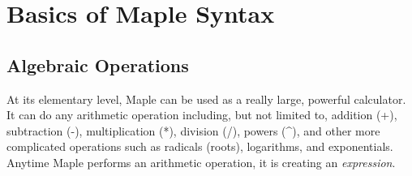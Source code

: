 \chapter{Basics of Maple Syntax}
\label{chp:basics_of_maple_syntax}

\section{Algebraic Operations}
\label{sec:algebraic_operations}

At its elementary level, Maple can be used as a really large, powerful calculator. It can do any arithmetic operation including, but not limited to, addition (+), subtraction (-), multiplication (*), division (/), powers (\textasciicircum), and other more complicated operations such as radicals (roots), logarithms, and exponentials. Anytime Maple performs an arithmetic operation, it is creating an \textit{expression}.

\begin{maplegroup}
\begin{mapleinput}
\end{mapleinput}
\mapleresult
\begin{maplelatex}
\end{maplelatex}
\end{maplegroup}

\begin{maplegroup}
\begin{mapleinput}
\end{mapleinput}
\mapleresult
\begin{maplelatex}
\end{maplelatex}
\end{maplegroup}

\begin{maplegroup}
\begin{mapleinput}
\end{mapleinput}
\mapleresult
\begin{maplelatex}
\end{maplelatex}
\end{maplegroup}



